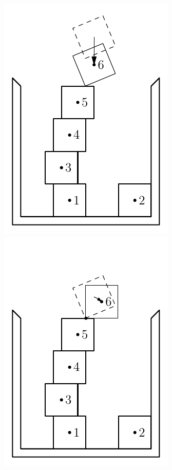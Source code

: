 \documentclass[12pt, sumlimits, intlimits]{article}
\begin{document}
\begin{figure}
\includegraphics[width=\w]{btr-2}%
\includegraphics[width=\w]{btr-3} \\

\end{figure}
\end{document}

